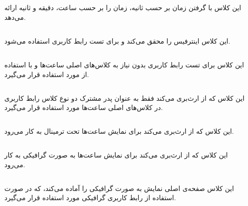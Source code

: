 \documentclass[oneside,a4paper,11pt]{report}
\begin{document}
\subsection{}

این کلاس با گرفتن زمان بر حسب ثانیه، زمان را بر حسب ساعت، دقیقه و ثانیه ارائه می‌دهد.



\subsection{}
این کلاس اینترفیس 
را محقق می‌کند و برای تست رابط کاربری استفاده می‌شود.

\subsection{}
این کلاس برای تست رابط کاربری بدون نیاز به کلاس‌های اصلی ساعت‌ها و با استفاده از 
مورد استفاده قرار می‌گیرد.

\subsection{}
	
	این کلاس که از 
	ارث‌بری می‌کند فقط به عنوان پدر مشترک دو نوع کلاس رابط کاربری در کلاس‌های اصلی ساعت‌ها مورد استفاده قرار می‌گیرد.
	
\subsection{}

	این کلاس که از 
ارث‌بری می‌کند برای نمایش ساعت‌ها تحت ترمینال به کار می‌رود.

\subsection{}

این کلاس که از 
ارث‌بری می‌کند برای نمایش ساعت‌ها به صورت گرافیکی به کار می‌رود.

\subsection{}
این کلاس صفحه‌ی اصلی نمایش به صورت گرافیکی را آماده می‌کند، که در صورت استفاده از رابط کاربری گرافیکی مورد استفاده قرار می‌گیرد.


\end{document}
